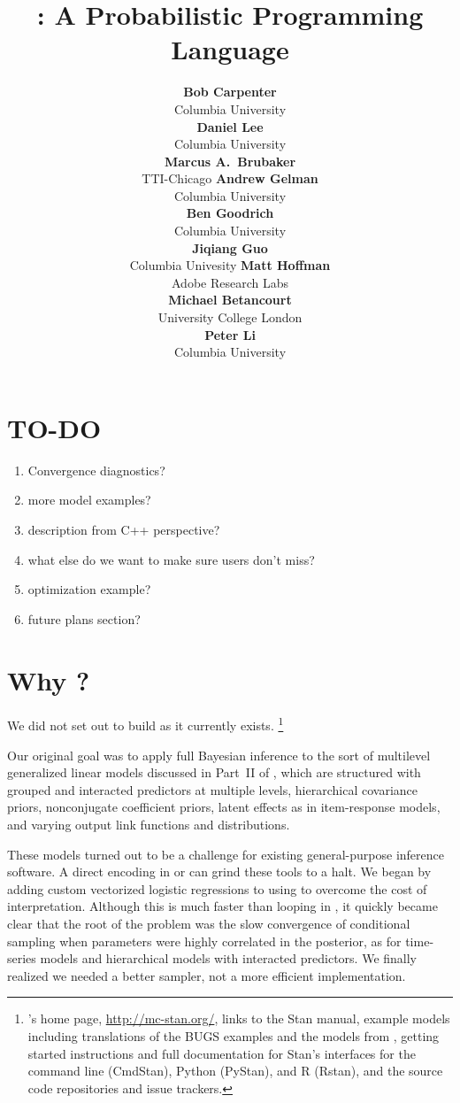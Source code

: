 \documentclass[article]{jss}
\author{{\bf\large Bob Carpenter}
        \\ Columbia University
        \\[9pt]
        {\bf\large Daniel Lee}
        \\ Columbia University
        \\[9pt]
        {\bf\large Marcus A.\ Brubaker}
        \\ TTI-Chicago
    \And
        {\bf\large Andrew Gelman}
        \\ Columbia University
        \\[9pt]
        {\bf\large Ben Goodrich}
        \\ Columbia University
        \\[9pt]
        {\bf\large Jiqiang Guo}
        \\ Columbia Univesity
     \And
        {\bf\large Matt Hoffman}
        \\ Adobe Research Labs
        \\[9pt]
        {\bf\large Michael Betancourt}
        \\ University College London
        \\[9pt]
        {\bf\large Peter Li}
        \\ Columbia University
}
\title{\proglang{Stan}: A Probabilistic Programming Language}
\begin{document}
\section{TO-DO}

\begin{enumerate}
\item Convergence diagnostics?
\item more model examples?
\item description from C++ perspective?
\item what else do we want to make sure users don't miss?
\item optimization example?
\item future plans section?
\end{enumerate}


\section[Why Stan?]{Why ?}

We did not set out to build  as it currently exists.%
%
\footnote{'s home page, \url{http://mc-stan.org/},
  links to the Stan manual, example models including translations of
  the BUGS examples and the models from \citep{GelmanHill:2007},
  getting started instructions and full documentation for Stan's
  interfaces for the command line (CmdStan), Python (PyStan), and
  R (Rstan), and the source code repositories and issue trackers.}


Our original goal was to apply full Bayesian inference to the sort of multilevel
generalized linear models discussed in Part~II of
\citep{GelmanHill:2007}, which are structured with grouped and
interacted predictors at multiple levels, hierarchical covariance
priors, nonconjugate coefficient priors, latent effects as in
item-response models, and varying output link functions and
distributions.

These models turned out to be a challenge for
existing general-purpose inference software.  A direct encoding in
 \citep{LunnEtAl:2000,LunnEtAl:2009,LunnEtAl:2012} or
 \citep{Plummer:2003} can grind these tools to a halt.
We began by adding custom vectorized logistic regressions to 
using  to overcome the cost of interpretation.  Although
this is much faster than looping in , it quickly became
clear that the root of the problem was the slow convergence of
conditional sampling when parameters were highly correlated 
in the posterior, as for time-series models and hierarchical models 
with interacted predictors.  We finally realized we needed a better sampler, 
not a more efficient implementation.
\end{document}
